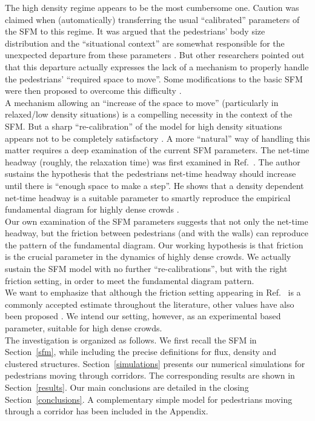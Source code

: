 The high density regime appears to be the most cumbersome one. Caution was 
claimed when (automatically) transferring the usual ``calibrated'' parameters 
of the SFM to this regime. It was argued that the pedestrians' body size 
distribution and the ``situational context'' are somewhat responsible for the 
unexpected departure from these parameters \cite{johansson1,kwak}. But other 
researchers pointed out that this departure actually expresses the lack of a 
mechanism to properly handle the pedestrians' ``required space to move''. Some 
modifications to the basic SFM were then proposed to overcome this difficulty 
\cite{parisi2,seyfried2}. \\

A mechanism allowing an ``increase of the space to move'' (particularly in relaxed/low density situations) is a compelling necessity in the context of the SFM.
But a sharp ``re-calibration'' of the model for high density situations appears not 
to be completely satisfactory \cite{johansson}. A more ``natural'' way of 
handling this matter requires a deep examination of the current SFM parameters. 
The net-time headway (roughly, the relaxation time) was first examined in 
Ref.~\cite{johansson}. The author sustains the hypothesis that the 
pedestrians net-time headway should increase until there is ``enough space to 
make a step''.  He shows that a density dependent net-time headway is a 
suitable parameter to smartly reproduce the empirical fundamental diagram for 
highly dense crowds \cite{johansson}.  \\ 

Our own examination of the SFM parameters suggests that not only the net-time 
headway, but the friction between pedestrians (and with the walls) can 
reproduce the pattern of the fundamental diagram. Our working hypothesis is 
that friction is the crucial parameter in the dynamics of highly dense crowds. 
We actually sustain the SFM model with no further ``re-calibrations'', but 
with the right friction setting, in order to meet the fundamental diagram 
pattern. \\  

We want to emphasize that although the friction setting appearing in 
Ref.~\cite{Helbing1} is a commonly accepted estimate throughout the  
literature, other values have also been proposed \cite{colombi2017}. We 
intend our setting, however, as an experimental based parameter, suitable for 
high dense crowds. \\

The investigation is organized as follows. We first recall the SFM in 
Section~\ref{sfm}, while including the precise definitions for flux, density 
and clustered structures. Section~\ref{simulations} presents our numerical 
simulations for pedestrians moving through corridors. The corresponding results 
are shown in Section~\ref{results}. Our main conclusions are detailed in the 
closing Section~\ref{conclusions}. A complementary simple model for pedestrians 
moving through a corridor has been included in the Appendix. \\     

